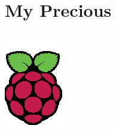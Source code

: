 \section{My Precious}

\begin{frame}
    \frametitle{}
    \begin{columns}

        \includegraphics[width=0.9\linewidth]{Assets/raspberrypi.png}


\end{columns}
\end{frame}
